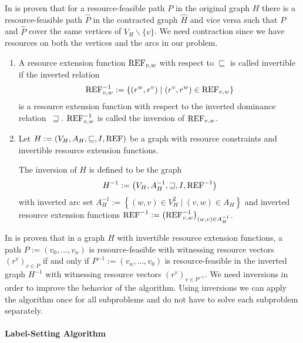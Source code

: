 In \cite[p.~79]{Kaiser} is proven that for a resource-feasible path $P$ in the original graph $H$ there is a resource-feasible path $\widehat{P}$ in the contracted graph $\widehat{H}$ and vice versa such that $P$ and $\widehat{P}$ cover the same vertices of $V_H\backslash\{v\}$. We need contraction since we have resources on both the vertices and the arcs in our problem. 

\begin{definition}[Inversion]

\begin{enumerate}
	\item{A resource extension function}
$\operatorname{REF}_{v,w}$ with respect to $\sqsubseteq$ is called invertible if the inverted relation
\begin{align*}
	\operatorname{REF}^{-1}_{v,w} := \left\{\left(r^w,r^v\right)\mid\left(r^v,r^w\right)\in\operatorname{REF}_{v,w}\right\}
\end{align*}
is a resource extension function with respect to the inverted dominance relation~$\sqsupseteq$. $\operatorname{REF}^{-1}_{v,w}$ is called the inversion of $\operatorname{REF}_{v,w}$.
	\item{Let}
${H := \left(V_H,A_H,\sqsubseteq,I,\operatorname{REF}\right)}$ be a graph with resource constraints and invertible resource extension functions.

The inversion of $H$ is defined to be the graph
\begin{align*}
	H^{-1} := \left(V_H,A^{-1}_H,\sqsupseteq,I,\operatorname{REF}^{-1}\right)
\end{align*}
with inverted arc set ${A_H^{-1}:=\left\{(w,v)\in V_H^2\mid (v,w)\in A_H\right\}}$ and inverted resource extension functions ${\operatorname{REF}^{-1} := \left(\operatorname{REF}^{-1}_{v,w}\right)_{(w,v)\in A^{-1}_H}}$.
\end{enumerate}

\end{definition}

In \cite[p.~83]{Kaiser} is proven that in a graph $H$ with invertible resource extension functions, a path ${P:=\left(v_0,\dots,v_n\right)}$ is resource-feasible with witnessing resource vectors ${\left(r^v\right)_{v\in P}}$ if and only if ${P^{-1}:=\left(v_n,\dots,v_0\right)}$ is resource-feasible in the inverted graph $H^{-1}$ with witnessing resource vectors $\left(r^v\right)_{v\in P^{-1}}$. We need inversions in order to improve the behavior of the algorithm. Using inversions we can apply the algorithm once for all subproblems and do not have to solve each subproblem separately.

\paragraph{Label-Setting Algorithm} \parfill

